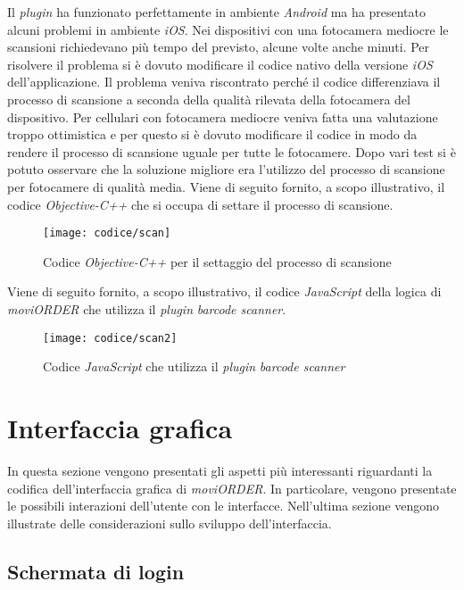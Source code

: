 Il \textit{plugin} ha funzionato perfettamente in ambiente \textit{Android} ma ha presentato alcuni problemi in ambiente \textit{iOS}. Nei dispositivi con una fotocamera mediocre le scansioni richiedevano più tempo del previsto, alcune volte anche minuti. Per risolvere il problema si è dovuto modificare il codice nativo della versione \textit{iOS} dell'applicazione. Il problema veniva riscontrato perché il codice differenziava il processo di scansione a seconda della qualità rilevata della fotocamera del dispositivo. Per cellulari con fotocamera mediocre veniva fatta una valutazione troppo ottimistica e per questo si è dovuto modificare il codice in modo da rendere il processo di scansione uguale per tutte le fotocamere. Dopo vari test si è potuto osservare che la soluzione migliore era l'utilizzo del processo di scansione per fotocamere di qualità media. Viene di seguito fornito, a scopo illustrativo, il codice \textit{Objective-C++} che si occupa di settare il processo di scansione.
\begin{figure}[!h] 
    \centering 
    \texttt{[image: codice/scan]} 
    \caption{Codice \textit{Objective-C++} per il settaggio del processo di scansione}
\end{figure}

\newpage

Viene di seguito fornito, a scopo illustrativo, il codice \textit{JavaScript} della logica di \textit{moviORDER} che utilizza il \textit{plugin} \textit{barcode scanner}.

\begin{figure}[!h] 
    \centering 
    \texttt{[image: codice/scan2]} 
    \caption{Codice \textit{JavaScript} che utilizza il \textit{plugin} \textit{barcode scanner}}
\end{figure}

\newpage

\section{Interfaccia grafica}

In questa sezione vengono presentati gli aspetti più interessanti riguardanti la codifica dell'interfaccia grafica di \textit{moviORDER}. In particolare, vengono presentate le possibili interazioni dell'utente con le interfacce. Nell'ultima sezione vengono illustrate delle considerazioni sullo sviluppo dell'interfaccia.

\subsection{Schermata di login}

